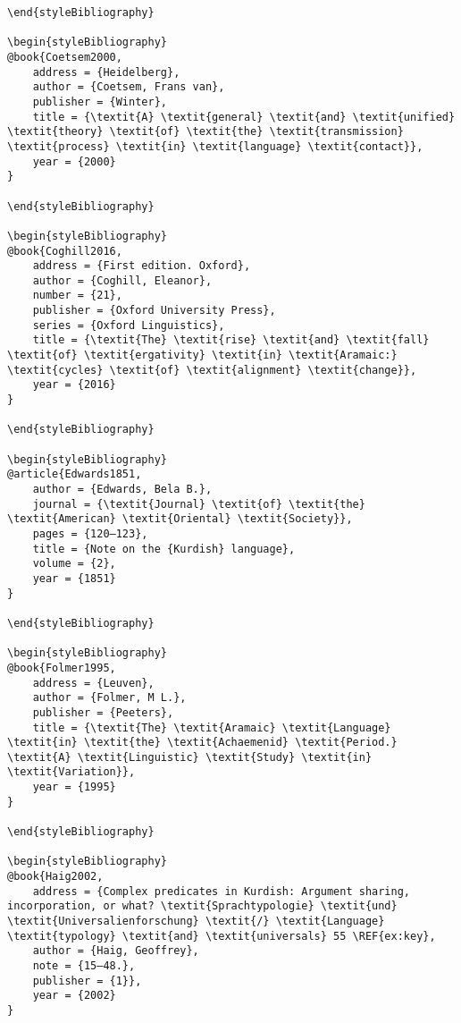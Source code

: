 \documentclass[output=paper]{langsci/langscibook}
\begin{document}
\begin{verbatim}
\end{styleBibliography}

\begin{styleBibliography}
@book{Coetsem2000,
	address = {Heidelberg},
	author = {Coetsem, Frans van},
	publisher = {Winter},
	title = {\textit{A} \textit{general} \textit{and} \textit{unified} \textit{theory} \textit{of} \textit{the} \textit{transmission} \textit{process} \textit{in} \textit{language} \textit{contact}},
	year = {2000}
}

\end{styleBibliography}

\begin{styleBibliography}
@book{Coghill2016,
	address = {First edition. Oxford},
	author = {Coghill, Eleanor},
	number = {21},
	publisher = {Oxford University Press},
	series = {Oxford Linguistics},
	title = {\textit{The} \textit{rise} \textit{and} \textit{fall} \textit{of} \textit{ergativity} \textit{in} \textit{Aramaic:} \textit{cycles} \textit{of} \textit{alignment} \textit{change}},
	year = {2016}
}

\end{styleBibliography}

\begin{styleBibliography}
@article{Edwards1851,
	author = {Edwards, Bela B.},
	journal = {\textit{Journal} \textit{of} \textit{the} \textit{American} \textit{Oriental} \textit{Society}},
	pages = {120–123},
	title = {Note on the {Kurdish} language},
	volume = {2},
	year = {1851}
}

\end{styleBibliography}

\begin{styleBibliography}
@book{Folmer1995,
	address = {Leuven},
	author = {Folmer, M L.},
	publisher = {Peeters},
	title = {\textit{The} \textit{Aramaic} \textit{Language} \textit{in} \textit{the} \textit{Achaemenid} \textit{Period.} \textit{A} \textit{Linguistic} \textit{Study} \textit{in} \textit{Variation}},
	year = {1995}
}

\end{styleBibliography}

\begin{styleBibliography}
@book{Haig2002,
	address = {Complex predicates in Kurdish: Argument sharing, incorporation, or what? \textit{Sprachtypologie} \textit{und} \textit{Universalienforschung} \textit{/} \textit{Language} \textit{typology} \textit{and} \textit{universals} 55 \REF{ex:key},
	author = {Haig, Geoffrey},
	note = {15–48.},
	publisher = {1}},
	year = {2002}
}


\end{verbatim}
\end{document}
